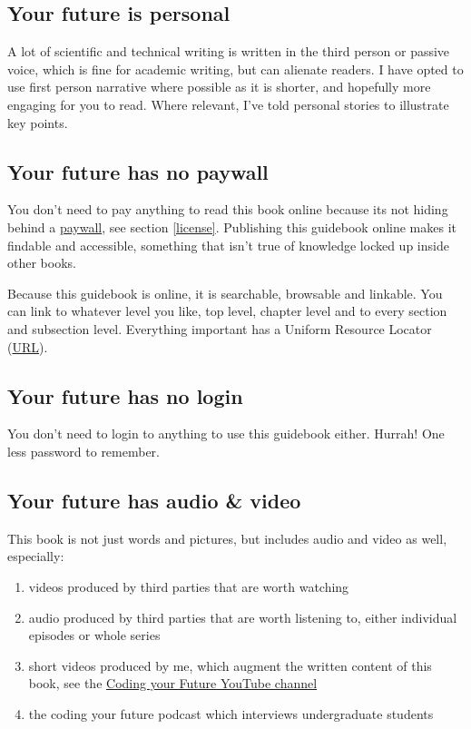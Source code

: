 \documentclass[
]{book}
\providecommand{\tightlist}{%
  \setlength{\itemsep}{0pt}\setlength{\parskip}{0pt}}
\begin{document}
\hypertarget{firstperson}{%
\subsection{Your future is personal}\label{firstperson}}

A lot of scientific and technical writing is written in the third person or passive voice, which is fine for academic writing, but can alienate readers. I have opted to use first person narrative where possible as it is shorter, and hopefully more engaging for you to read. \citep{googler} Where relevant, I've told personal stories to illustrate key points.

\hypertarget{openaccess}{%
\subsection{Your future has no paywall}\label{openaccess}}

You don't need to pay anything to read this book online because its not hiding behind a \href{https://en.wikipedia.org/wiki/Paywall}{paywall}, see section \ref{license}. Publishing this guidebook online makes it findable and accessible, something that isn't true of knowledge locked up inside other books.

Because this guidebook is online, it is searchable, browsable and linkable. You can link to whatever level you like, top level, chapter level and to every section and subsection level. Everything important has a Uniform Resource Locator (\href{https://en.wikipedia.org/wiki/URL}{URL}).

\hypertarget{nologin}{%
\subsection{Your future has no login}\label{nologin}}

You don't need to login to anything to use this guidebook either. Hurrah! One less password to remember.

\hypertarget{av}{%
\subsection{Your future has audio \& video}\label{av}}

This book is not just words and pictures, but includes audio and video as well, especially:

\begin{enumerate}
\def\labelenumi{\arabic{enumi}.}
\tightlist
\item
  videos produced by third parties that are worth watching
\item
  audio produced by third parties that are worth listening to, either individual episodes or whole series
\item
  short videos produced by me, which augment the written content of this book, see the \href{https://www.youtube.com/channel/UCLBv_u8JmyUPqmRALIjVnLg}{Coding your Future YouTube channel}
\item
  the coding your future podcast which interviews undergraduate students
\end{enumerate}
\end{document}
